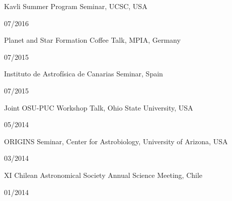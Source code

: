 \documentclass[11pt, a4paper]{article} %
\begin{document}
\begin{minipage}[t]{0.7\textwidth}
\begin{flushleft}%
  \setlength{\leftskip}{0.2cm}%
Kavli Summer Program Seminar, UCSC, USA
\end{flushleft}
\end{minipage}
\begin{minipage}[t]{0.3\textwidth}
\hfill 07/2016
\end{minipage}
\begin{minipage}[t]{0.7\textwidth}
\begin{flushleft}%
  \setlength{\leftskip}{0.2cm}%
Planet and Star Formation Coffee Talk, MPIA, Germany
\end{flushleft}
\end{minipage}
\begin{minipage}[t]{0.3\textwidth}
\hfill 07/2015
\end{minipage}
\begin{minipage}[t]{0.7\textwidth}
\begin{flushleft}%
  \setlength{\leftskip}{0.2cm}%
Instituto de Astrof\'isica de Canarias Seminar, Spain
\end{flushleft}
\end{minipage}
\begin{minipage}[t]{0.3\textwidth}
\hfill 07/2015
\end{minipage}
\begin{minipage}[t]{0.7\textwidth}
\begin{flushleft}%
  \setlength{\leftskip}{0.2cm}%
Joint OSU-PUC Workshop Talk, Ohio State University, USA
\end{flushleft}
\end{minipage}
\begin{minipage}[t]{0.3\textwidth}
\hfill 05/2014
\end{minipage}

\begin{minipage}[t]{0.7\textwidth}
\begin{flushleft}%
  \setlength{\leftskip}{0.2cm}%
ORIGINS Seminar, Center for Astrobiology, University of Arizona, USA
\end{flushleft}
\end{minipage}
\begin{minipage}[t]{0.3\textwidth}
\hfill 03/2014
\end{minipage}

\begin{minipage}[t]{0.7\textwidth}
\begin{flushleft}%
  \setlength{\leftskip}{0.2cm}%
XI Chilean Astronomical Society Annual Science Meeting, Chile 
\end{flushleft}
\end{minipage}
\begin{minipage}[t]{0.3\textwidth}
\hfill 01/2014
\end{minipage}
\end{document}
